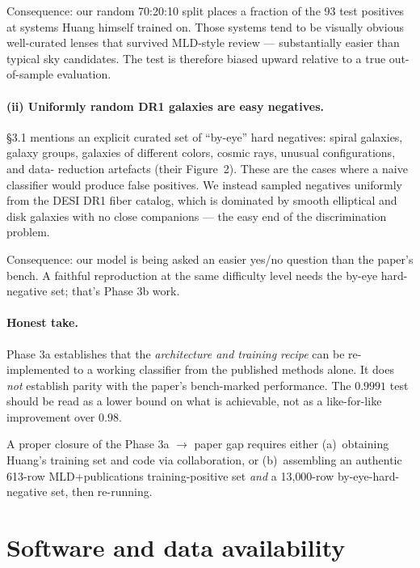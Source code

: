 \documentclass[11pt,letterpaper]{article}
\begin{document}
Consequence: our random 70:20:10 split places a fraction of the 93 test
positives at systems Huang himself trained on. Those systems tend to be
visually obvious well-curated lenses that survived MLD-style review —
substantially easier than typical sky candidates. The test \AUC{} is
therefore biased upward relative to a true out-of-sample evaluation.

\paragraph{(ii) Uniformly random DR1 galaxies are easy negatives.}
\textcite{huang2020decals} \S3.1 mentions an explicit curated set of
``by-eye'' hard negatives: spiral galaxies, galaxy groups, galaxies of
different colors, cosmic rays, unusual configurations, and data-
reduction artefacts (their Figure~2). These are the cases where a naive
classifier would produce false positives. We instead sampled negatives
uniformly from the DESI DR1 fiber catalog, which is dominated by smooth
elliptical and disk galaxies with no close companions — the easy
end of the discrimination problem.

Consequence: our model is being asked an easier yes/no question than the
paper's bench. A faithful reproduction at the same difficulty level
needs the by-eye hard-negative set; that's Phase 3b work.

\paragraph{Honest take.} Phase 3a establishes that the \emph{architecture
and training recipe} can be re-implemented to a working classifier from
the published methods alone. It does \emph{not} establish parity with
the paper's bench-marked performance. The $0.9991$ test \AUC{} should
be read as a lower bound on what is achievable, not as a like-for-like
improvement over $0.98$.

A proper closure of the Phase 3a $\to$ paper gap requires either
(a)~obtaining Huang's training set and code via collaboration, or
(b)~assembling an authentic 613-row MLD+publications training-positive
set \emph{and} a 13{,}000-row by-eye-hard-negative set, then re-running.

\section{Software and data availability}
\end{document}
